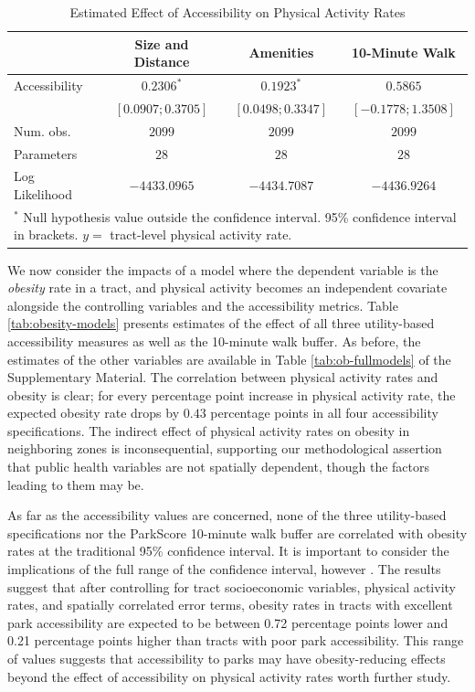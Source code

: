 \documentclass[shortAfour,sageh.bst]{sagej}
\begin{document}
\begin{table}
\caption{Estimated Effect of Accessibility on Physical Activity Rates}
\label{tab:pa-models}

\begin{tabular}{l c c c}
\toprule
 & Size and Distance & Amenities & 10-Minute Walk \\
\midrule
Accessibility  & $0.2306^{*}$        & $0.1923^{*}$        & $0.5865$             \\
               & $ [0.0907; 0.3705]$ & $ [0.0498; 0.3347]$ & $ [-0.1778; 1.3508]$ \\
\midrule
Num. obs.      & $2099$              & $2099$              & $2099$               \\
Parameters     & $28$                & $28$                & $28$                 \\
Log Likelihood & $-4433.0965$        & $-4434.7087$        & $-4436.9264$         \\
\bottomrule
\multicolumn{4}{l}{\scriptsize{$^*$ Null hypothesis value outside the confidence interval. 95\% confidence interval in brackets.  $y = $ tract-level physical activity rate.}}
\end{tabular}
\end{table}

We now consider the impacts of a model where the dependent variable is
the \emph{obesity} rate in a tract, and physical activity becomes an
independent covariate alongside the controlling variables and the
accessibility metrics. Table \ref{tab:obesity-models} presents estimates
of the effect of all three utility-based accessibility measures as well
as the 10-minute walk buffer. As before, the estimates of the other
variables are available in Table \ref{tab:ob-fullmodels} of the
Supplementary Material. The correlation between physical activity rates
and obesity is clear; for every percentage point increase in physical
activity rate, the expected obesity rate drops by \(0.43\) percentage
points in all four accessibility specifications. The indirect effect of
physical activity rates on obesity in neighboring zones is
inconsequential, supporting our methodological assertion that public
health variables are not spatially dependent, though the factors leading
to them may be.

As far as the accessibility values are concerned, none of the three
utility-based specifications nor the ParkScore 10-minute walk buffer are
correlated with obesity rates at the traditional 95\% confidence
interval. It is important to consider the implications of the full range
of the confidence interval, however \citep{Amrhein2019}. The results
suggest that after controlling for tract socioeconomic variables,
physical activity rates, and spatially correlated error terms, obesity
rates in tracts with excellent park accessibility are expected to be
between 0.72 percentage points lower and 0.21 percentage points higher
than tracts with poor park accessibility. This range of values suggests
that accessibility to parks may have obesity-reducing effects beyond the
effect of accessibility on physical activity rates worth further study.
\end{document}
